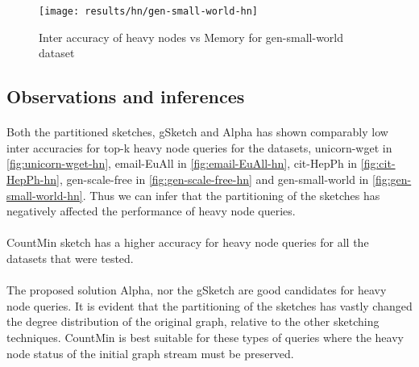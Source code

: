 \begin{figure}[H]
    \centering \texttt{[image: results/hn/gen-small-world-hn]}
    \vspace{-0.5cm}
    \caption{Inter accuracy of heavy nodes vs Memory for gen-small-world dataset}
    \label{fig:gen-small-world-hn}
\end{figure}

\subsection*{Observations and inferences}

\paragraph{}
Both the partitioned sketches, gSketch and Alpha has shown comparably low inter accuracies for top-k heavy node queries for the datasets, unicorn-wget in \autoref{fig:unicorn-wget-hn}, email-EuAll in \autoref{fig:email-EuAll-hn}, cit-HepPh in \autoref{fig:cit-HepPh-hn}, gen-scale-free in \autoref{fig:gen-scale-free-hn} and gen-small-world in \autoref{fig:gen-small-world-hn}. Thus we can infer that the partitioning of the sketches has negatively affected the performance of heavy node queries.

\paragraph{}
CountMin sketch has a higher accuracy for heavy node queries for all the datasets that were tested.

\paragraph{}
The proposed solution Alpha, nor the gSketch are good candidates for heavy node queries. It is evident that the partitioning of the sketches has vastly changed the degree distribution of the original graph, relative to the other sketching techniques. CountMin is best suitable for these types of queries where the heavy node status of the initial graph stream must be preserved.
